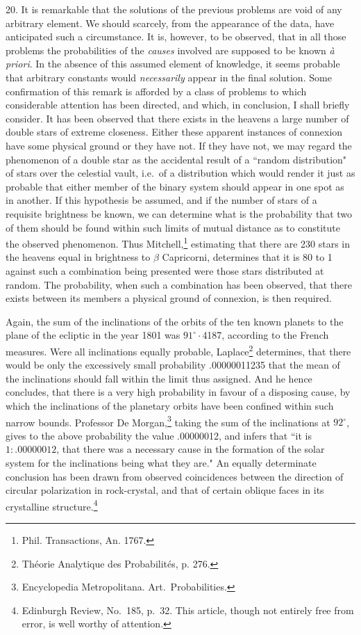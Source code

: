 \documentclass[oneside]{book}
\begin{document}
20. It is remarkable that the solutions of the previous problems
are void of any arbitrary element. We should scarcely,
from the appearance of the data, have anticipated such a
circumstance. It is, however, to be observed, that in all those problems
the probabilities of the \emph{causes} involved are supposed to be known
\textit{\`{a} priori}. In the absence of this assumed element of knowledge,
it seems probable that arbitrary constants would \emph{necessarily} appear
in the final solution. Some confirmation of this remark is
afforded by a class of problems to which considerable attention
has been directed, and which, in conclusion, I shall briefly
consider.
It has been observed that there exists in the heavens a large
number of double stars of extreme closeness. Either these apparent
instances of connexion have some physical ground or they
have not. If they have not, we may regard the phenomenon of a
double star as the accidental result of a ``random distribution" of
stars over the celestial vault, i.e.\ of a distribution which would
render it just as probable that either member of the binary system
should appear in one spot as in another. If this hypothesis be
assumed, and if the number of stars of a requisite brightness be
known, we can determine what is the probability that two of
them should be found within such limits of mutual distance as
to constitute the observed phenomenon. Thus Mitchell,\footnote{Phil. Transactions, An. 1767.}
estimating that there are 230 stars in the heavens equal in brightness
to $\beta$ Capricorni, determines that it is 80 to 1 against such a
combination being presented were those stars distributed at
random. The probability, when such a combination has been
observed, that there exists between its members a physical ground
of connexion, is then required.

Again, the sum of the inclinations of the orbits of the ten
known planets to the plane of the ecliptic in the year 1801 was
$91^{\circ}\cdot$4187, according to the French measures. Were all
inclinations equally probable, Laplace\footnote{Th\'{e}orie Analytique
des Probabilit\'{e}s, p. 276.} determines, that there would be
only the excessively small probability .00000011235 that the
mean of the inclinations should fall within the limit thus
assigned. And he hence concludes, that there is a very high
probability in favour of a disposing cause, by which the inclinations
of the planetary orbits have been confined within such narrow
bounds. Professor De Morgan,\footnote{Encyclopedia Metropolitana. Art.\ Probabilities.} taking the sum of the inclinations
at $92^{\circ}$, gives to the above probability the value .00000012,
and infers that ``it is $1\colon .00000012$, that there was a necessary
cause in the formation of the solar system for the inclinations
being what they are." An equally determinate conclusion has
been drawn from observed coincidences between the direction of
circular polarization in rock-crystal, and that of certain oblique
faces in its crystalline structure.\footnote{Edinburgh Review, No.~185, p.~32.  This
article, though not entirely free from error, is well worthy of attention.}
\end{document}
